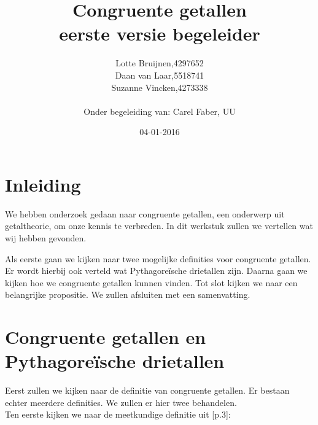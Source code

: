 \documentclass[12pt,reqno]{article}
\title{\textbf{Congruente getallen}\\
		\small{eerste versie begeleider}}
\author{
	\begin{tabular}{ l l }
		Lotte Bruijnen, & 4297652 \\
		Daan van Laar, & 5518741 \\
		Suzanne Vincken, & 4273338
	\end{tabular}\\
	Onder begeleiding van: Carel Faber, UU
}
\date{04-01-2016}
\newcommand*{\NN}{\ensuremath{\mathbb{N}}}
\theoremstyle{theorem}
\theoremstyle{definition}
\begin{document}
	
	\begin{titlepage}
		\maketitle
	\end{titlepage}

	\allowdisplaybreaks
	
	\section{Inleiding}
	We hebben onderzoek gedaan naar congruente getallen, een onderwerp uit getaltheorie, om onze kennis te verbreden. In dit werkstuk zullen we vertellen wat wij hebben gevonden.
	
	Als eerste gaan we kijken naar twee mogelijke definities voor congruente getallen. Er wordt hierbij ook verteld wat Pythagore\"ische drietallen zijn. Daarna gaan we kijken hoe we congruente getallen kunnen vinden. Tot slot kijken we naar een belangrijke propositie. We zullen afsluiten met een samenvatting.
	
	
	
	
	\section{Congruente getallen en Pythagore\"ische drietallen}	
	Eerst zullen we kijken naar de definitie van congruente getallen. Er bestaan echter meerdere definities. We zullen er hier twee behandelen.\\
	
	Ten eerste kijken we naar de meetkundige definitie uit \cite{Oort}[p.3]:	
	
\end{document}
